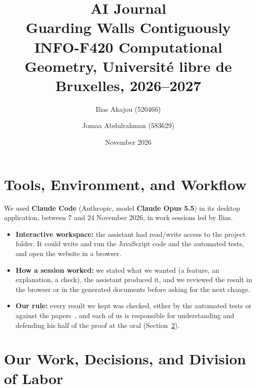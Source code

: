 \documentclass[11pt,a4paper]{article}
\title{\textbf{AI Journal}\\[4pt]
\large Guarding Walls Contiguously\\[2pt]
\normalsize INFO-F420 Computational Geometry, Universit\'e libre de Bruxelles, 2026--2027}
\author{Ilias Akajou (520466) \and Jomaa Abdulrahman (583629)}
\date{November 2026}
\begin{document}
\maketitle

\section{Tools, Environment, and Workflow}

We used \textbf{Claude Code} (Anthropic, model \textbf{Claude Opus 5.5}) in its desktop application, between 7 and 24 November 2026, in work sessions
led by Ilias.

\begin{itemize}[leftmargin=*]
\item \textbf{Interactive workspace:} the assistant had read/write access to the project folder. It could write and run the JavaScript code and the
automated tests, and open the website in a browser.
\item \textbf{How a session worked:} we stated what we wanted (a feature, an explanation, a check), the assistant produced it, and we reviewed the result in
the browser or in the generated documents before asking for the next change.
\item \textbf{Our rule:} every result we kept was checked, either by the automated tests or against the papers~\cite{deBerg2025,deBerg2026,Biniaz2025}, and each of
us is responsible for understanding and defending his half of the proof at the oral (Section~\ref{sec:ours}).
\end{itemize}

\section{Our Work, Decisions, and Division of Labor}
\label{sec:ours}
\end{document}
